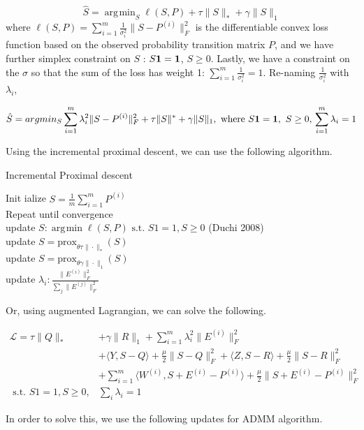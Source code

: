 \documentclass[11pt]{article}
\DeclareMathOperator*{\argmin}{\arg\!\min}
\begin{document}
$$\hat{S} = \argmin_S \ell(S,P) + \tau \|S\|_* + \gamma \|S\|_1$$
where $\ell(S,P) = \sum_{i=1}^{m} \frac{1}{\sigma_i^2} \|S-P^{(i)}\|_F^2$ is the differentiable convex loss function based on the observed probability transition matrix $P$, and we have further simplex constraint on $S$ : $S\bf{1} = \bf{1}$, $S\geq 0$. Lastly, we have a constraint on the $\sigma$ so that the sum of the loss has weight 1: $\sum_{i=1}^{m} \frac{1}{\sigma_i^2} = 1$. Re-naming $\frac{1}{\sigma_i^2}$ with $\lambda_i$,

$$\hat{S} = argmin_S \sum_{i=1}^{m} \lambda^2_i \|S-P^{(i)}\|_F^2 + \tau \|S\|^* + \gamma \|S\|_1, \text{ where } S\bf{1} = \bf{1}, \text{ $S\geq 0$,   $\sum_{i=1}^{m}\lambda_i = 1$}$$


Using the incremental proximal descent, we can use the following algorithm.

\begin{algorithm}
\caption{Incremental Proximal descent} \label{IPD}
 Init ialize $S = \frac{1}{m} \sum_{i=1}^{m} P^{(i)}$\\
 Repeat until convergence\\
  update $S : \argmin \ell(S,P) \text{ s.t. } S1 = 1, S\geq 0$ (Duchi 2008)\\
  \hspace{5mm}update $S = \text{prox}_{\theta \tau\|\cdot\|_*} (S) $\\
  \hspace{5mm}update $S = \text{prox}_{\theta \gamma \|\cdot\|_1}(S)$\\
  \hspace{5mm}update $\lambda_i : \frac{\|E^{(i)} \|_F^2}{\sum_j \|E^{(j)} \|_F^2} $
\end{algorithm}

Or, using augmented Lagrangian, we can solve the following.

\begin{align*}
\mathcal{L} = \tau\|Q\|_* &+ \gamma \|R\|_1 + \sum_{i=1}^{m} \lambda^2_i \|E^{(i)}\|_F^2\\
&+ \langle Y, S-Q\rangle + \frac{\mu}{2} \|S-Q\|_F^2 + \langle Z, S-R\rangle + \frac{\mu}{2} \|S-R\|_F^2\\
&+ \sum_{i=1}^{m} \langle W^{(i)}, S+E^{(i)}-P^{(i)} \rangle + \frac{\mu}{2} \|S + E^{(i)} - P^{(i)}\|_F^2\\
\text{  s.t.  } S1 = 1, S\geq 0, &\sum_i \lambda_i = 1
\end{align*}

In order to solve this, we use the following updates for ADMM algorithm.
\end{document}
